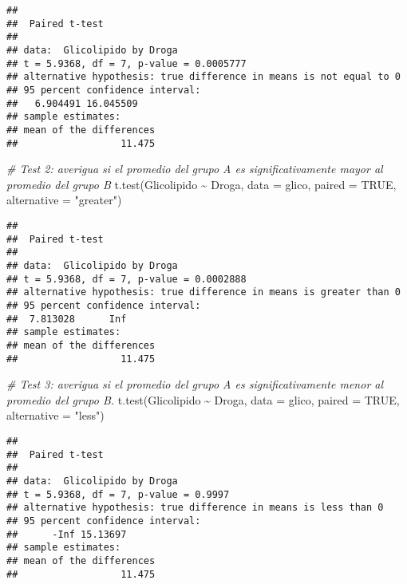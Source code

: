 \documentclass[
]{article}
\newenvironment{Shaded}{}{}
\newcommand{\AttributeTok}[1]{\textcolor[rgb]{0.49,0.56,0.16}{#1}}
\newcommand{\CommentTok}[1]{\textcolor[rgb]{0.38,0.63,0.69}{\textit{#1}}}
\newcommand{\ConstantTok}[1]{\textcolor[rgb]{0.53,0.00,0.00}{#1}}
\newcommand{\FunctionTok}[1]{\textcolor[rgb]{0.02,0.16,0.49}{#1}}
\newcommand{\NormalTok}[1]{#1}
\newcommand{\SpecialCharTok}[1]{\textcolor[rgb]{0.25,0.44,0.63}{#1}}
\newcommand{\StringTok}[1]{\textcolor[rgb]{0.25,0.44,0.63}{#1}}
\begin{document}
\begin{verbatim}
## 
##  Paired t-test
## 
## data:  Glicolipido by Droga
## t = 5.9368, df = 7, p-value = 0.0005777
## alternative hypothesis: true difference in means is not equal to 0
## 95 percent confidence interval:
##   6.904491 16.045509
## sample estimates:
## mean of the differences 
##                  11.475
\end{verbatim}

\begin{Shaded}
\begin{Highlighting}[]
\CommentTok{\# Test 2: averigua si el promedio del grupo A es significativamente mayor al promedio del grupo B}
\FunctionTok{t.test}\NormalTok{(Glicolipido }\SpecialCharTok{\textasciitilde{}}\NormalTok{ Droga, }\AttributeTok{data =}\NormalTok{ glico, }
       \AttributeTok{paired =} \ConstantTok{TRUE}\NormalTok{, }\AttributeTok{alternative =} \StringTok{"greater"}\NormalTok{)}
\end{Highlighting}
\end{Shaded}

\begin{verbatim}
## 
##  Paired t-test
## 
## data:  Glicolipido by Droga
## t = 5.9368, df = 7, p-value = 0.0002888
## alternative hypothesis: true difference in means is greater than 0
## 95 percent confidence interval:
##  7.813028      Inf
## sample estimates:
## mean of the differences 
##                  11.475
\end{verbatim}

\begin{Shaded}
\begin{Highlighting}[]
\CommentTok{\# Test 3: averigua si el promedio del grupo A es significativamente menor al promedio del grupo B.}
\FunctionTok{t.test}\NormalTok{(Glicolipido }\SpecialCharTok{\textasciitilde{}}\NormalTok{ Droga, }\AttributeTok{data =}\NormalTok{ glico, }
       \AttributeTok{paired =} \ConstantTok{TRUE}\NormalTok{, }\AttributeTok{alternative =} \StringTok{"less"}\NormalTok{)}
\end{Highlighting}
\end{Shaded}

\begin{verbatim}
## 
##  Paired t-test
## 
## data:  Glicolipido by Droga
## t = 5.9368, df = 7, p-value = 0.9997
## alternative hypothesis: true difference in means is less than 0
## 95 percent confidence interval:
##      -Inf 15.13697
## sample estimates:
## mean of the differences 
##                  11.475
\end{verbatim}
\end{document}
